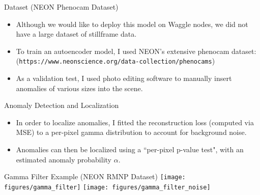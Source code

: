\documentclass[10pt]{beamer}
\newcommand{\tabimg}[2]{\begin{tabular}{c}\texttt{[image: \#1]}\end{tabular}}
\begin{document}
\begin{frame}{Dataset (NEON Phenocam Dataset)}

\begin{itemize}
\item Although we would like to deploy this model on Waggle nodes, we did not have a large dataset of stillframe data.\\[2mm]

\item To train an autoencoder model, I used NEON's extensive phenocam dataset:\\
(\texttt{https://www.neonscience.org/data-collection/phenocams})\\[2mm]

\item As a validation test, I used photo editing software to manually insert anomalies of various sizes into the scene.\\[1cm]
\end{itemize}


\end{frame}

\begin{frame}{Anomaly Detection and Localization}
\begin{itemize}
\item In order to localize anomalies, I fitted the reconstruction loss (computed via MSE) to a per-pixel gamma distribution to account for background noise.

\item Anomalies can then be localized using a ``per-pixel p-value test", with an estimated anomaly probability $\alpha$.

\end{itemize}

\begin{exampleblock}{Gamma Filter Example (NEON RMNP Dataset)}
\texttt{[image: figures/gamma\_filter]}
\texttt{[image: figures/gamma\_filter\_noise]}
\end{exampleblock}
\end{frame}
\end{document}
